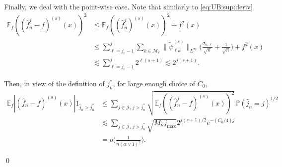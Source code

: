 \documentclass[preprint]{imsart}
\newcommand{\E}{{\mathbb E}}
\numberwithin{equation}{section}
\begin{document}
\begin{appendix}
Finally, we deal with the point-wise case. Note that similarly to \eqref{eq:UB:sup:deriv}
\begin{align*}
\E_f((\hat{f}_n^j- f)^{(s)} (x))^2
&\leq \E_f((\hat{f}_n^j)^{(s)} (x))^2+f^2(x)\\
&\leq \sum_{\ell=j_0-1}^{j}\sum_{k\in\mathcal{M}_\ell}\|\tilde\psi_{\ell k}^{(s)}\|_{L^\infty}\Big(\frac{\sigma_{\alpha,\ell}}{\sqrt{n}}+\frac{1}{\sqrt{n}}\Big)+f^2(x)\\
&\lesssim \sum_{\ell=j_0-1}^{j} 2^{\ell(s+1)}\lesssim 2^{j(s+1)}.
\end{align*}


Then, in view of the definition of $j_n^*$, for large enough choice of $C_0$,
\begin{align*}
\E_f|(\hat{f}_n-f)^{(s)}(x)| 1_{\hat{j}_n> j_n^*}
&\leq  \sum_{j\in\mathcal{J},\, j>j_n^*} \sqrt{\E_f((\hat{f}_n^j- f)^{(s)} (x))^2}\, \mathbb{P}(\hat{j}_n=j)^{1/2}\\
&\lesssim  \sum_{j\in\mathcal{J},\, j>j_n^*}  \sqrt{M_n j_{\max}}2^{j(s+1)/2}e^{-(C_0/4) j}\\
&=o\Big( \frac{1}{n(\alpha\vee1)^2}\Big).
\end{align*}

\hfill\qed




\end{appendix}


\end{document}
